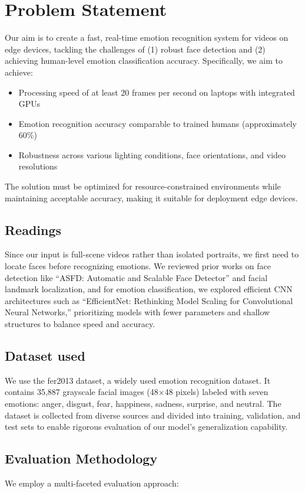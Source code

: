 \section{Problem Statement}
Our aim is to create a fast, real-time emotion recognition system for videos on edge devices, tackling the challenges of (1) robust face detection and (2) achieving human-level emotion classification accuracy. Specifically, we aim to achieve:

\begin{itemize}
    \item Processing speed of at least 20 frames per second on laptops with integrated GPUs
    \item Emotion recognition accuracy comparable to trained humans (approximately 60\%)
    \item Robustness across various lighting conditions, face orientations, and video resolutions
\end{itemize}

The solution must be optimized for resource-constrained environments while maintaining acceptable accuracy, making it suitable for deployment edge devices.

\subsection{Readings}
Since our input is full-scene videos rather than isolated portraits, we first need to locate faces before recognizing emotions. We reviewed prior works on face detection like ``ASFD: Automatic and Scalable Face Detector''\@\cite{ASFD} and facial landmark localization, and for emotion classification, we explored efficient CNN architectures such as ``EfficientNet: Rethinking Model Scaling for Convolutional Neural Networks,''\@\cite{EfficientNet} prioritizing models with fewer parameters and shallow structures to balance speed and accuracy.
\subsection{Dataset used}
We use the fer2013 dataset, a widely used emotion recognition dataset. It contains 35,887 grayscale facial images (48×48 pixels) labeled with seven emotions: anger, disgust, fear, happiness, sadness, surprise, and neutral. The dataset is collected from diverse sources and divided into training, validation, and test sets to enable rigorous evaluation of our model's generalization capability.

\subsection{Evaluation Methodology}
We employ a multi-faceted evaluation approach:

